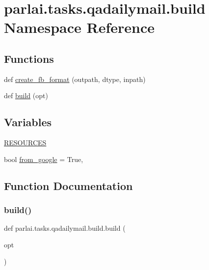 \hypertarget{namespaceparlai_1_1tasks_1_1qadailymail_1_1build}{}\section{parlai.\+tasks.\+qadailymail.\+build Namespace Reference}
\label{namespaceparlai_1_1tasks_1_1qadailymail_1_1build}
\subsection*{Functions}
\begin{DoxyCompactItemize}
\item 
def \hyperlink{namespaceparlai_1_1tasks_1_1qadailymail_1_1build_a91296a105f8b2d3f5c53d34282cf6e62}{create\+\_\+fb\+\_\+format} (outpath, dtype, inpath)
\item 
def \hyperlink{namespaceparlai_1_1tasks_1_1qadailymail_1_1build_ac5d9b858a94d4fe241cd57a6fd0ccf1c}{build} (opt)
\end{DoxyCompactItemize}
\subsection*{Variables}
\begin{DoxyCompactItemize}
\item 
\hyperlink{namespaceparlai_1_1tasks_1_1qadailymail_1_1build_a02ef3b1091c6cd3ab59d22b37d31ebf9}{R\+E\+S\+O\+U\+R\+C\+ES}
\item 
bool \hyperlink{namespaceparlai_1_1tasks_1_1qadailymail_1_1build_a86e0e34719bc9ae432fc5ef70ae2ca80}{from\+\_\+google} = True,
\end{DoxyCompactItemize}


\subsection{Function Documentation}
\mbox{\label{namespaceparlai_1_1tasks_1_1qadailymail_1_1build_ac5d9b858a94d4fe241cd57a6fd0ccf1c}} 
\subsubsection{\texorpdfstring{build()}{build()}}
{\footnotesize\ttfamily def parlai.\+tasks.\+qadailymail.\+build.\+build (\begin{DoxyParamCaption}\item[{}]{opt }\end{DoxyParamCaption})}




